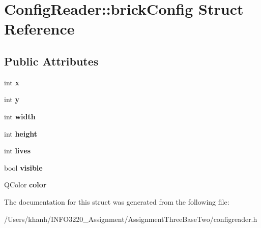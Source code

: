 \hypertarget{struct_config_reader_1_1brick_config}{\section{Config\+Reader\+:\+:brick\+Config Struct Reference}
\label{struct_config_reader_1_1brick_config}
}
\subsection*{Public Attributes}
\begin{DoxyCompactItemize}
\item 
\hypertarget{struct_config_reader_1_1brick_config_a97306017de3a7d20ea17d8d5eca27bae}{int {\bfseries x}}\label{struct_config_reader_1_1brick_config_a97306017de3a7d20ea17d8d5eca27bae}

\item 
\hypertarget{struct_config_reader_1_1brick_config_ae4f316df94d4fedcb6aa6dccd37cfaf8}{int {\bfseries y}}\label{struct_config_reader_1_1brick_config_ae4f316df94d4fedcb6aa6dccd37cfaf8}

\item 
\hypertarget{struct_config_reader_1_1brick_config_a1edb6d22e823376f8bbaba29b29384c2}{int {\bfseries width}}\label{struct_config_reader_1_1brick_config_a1edb6d22e823376f8bbaba29b29384c2}

\item 
\hypertarget{struct_config_reader_1_1brick_config_ab189679815b474acb9e534c3ff8d47f0}{int {\bfseries height}}\label{struct_config_reader_1_1brick_config_ab189679815b474acb9e534c3ff8d47f0}

\item 
\hypertarget{struct_config_reader_1_1brick_config_a67ed108f6bd2ca88a6746390f3ad8c03}{int {\bfseries lives}}\label{struct_config_reader_1_1brick_config_a67ed108f6bd2ca88a6746390f3ad8c03}

\item 
\hypertarget{struct_config_reader_1_1brick_config_a39758ce9079e0daf70be199bb253d3cc}{bool {\bfseries visible}}\label{struct_config_reader_1_1brick_config_a39758ce9079e0daf70be199bb253d3cc}

\item 
\hypertarget{struct_config_reader_1_1brick_config_a5d931551a92eca226bab528405d5d366}{Q\+Color {\bfseries color}}\label{struct_config_reader_1_1brick_config_a5d931551a92eca226bab528405d5d366}

\end{DoxyCompactItemize}


The documentation for this struct was generated from the following file\+:\begin{DoxyCompactItemize}
\item 
/\+Users/khanh/\+I\+N\+F\+O3220\+\_\+\+Assignment/\+Assignment\+Three\+Base\+Two/configreader.\+h\end{DoxyCompactItemize}
